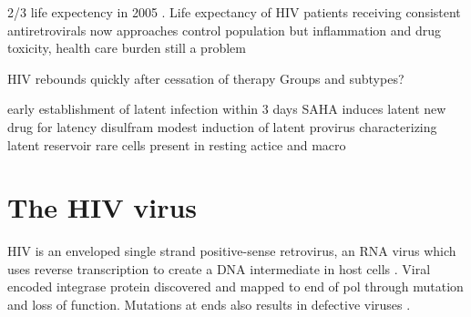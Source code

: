 \documentclass[../sherrill-Mix_thesis.tex]{subfiles}
\begin{document}
	2/3 life expectency in 2005 \citep{ATCC2008,Keiser2004}. Life expectancy of HIV patients receiving consistent antiretrovirals now approaches control population \citep{vanSighem2010,Nakagawa2013,Johnson2013} but inflammation and drug toxicity, health care burden still a problem \citep{Deeks2013}


	HIV rebounds quickly after cessation of therapy \citep{Cillo2014}
	Groups and subtypes?

	early establishment of latent infection \citep{Chun1998a} within 3 days \citep{Whitney2014}
	SAHA induces latent \citep{Contreras2009}
	new drug for latency disulfram \citep{Xing2011}
	modest induction of latent provirus \citep{Cillo2014}
	characterizing latent reservoir rare cells present in resting actice and macro \citep{Chun1997}


	





\section{The HIV virus}
	HIV is an enveloped single strand positive-sense retrovirus, an RNA virus which uses reverse transcription to create a DNA intermediate in host cells \citep{Baltimore1970,Temin1970}. Viral encoded integrase protein discovered \citep{Grandgenett1978} and mapped to \threePrime{} end of pol \citep{Panganiban1984,Schwartzberg1984,Donehower1984} through mutation and loss of function.  Mutations at ends also results in defective viruses \citep{Panganiban1983}.
\end{document}
